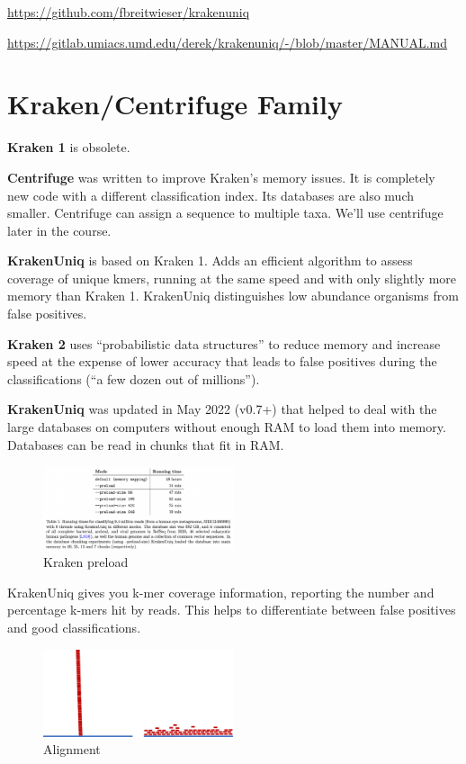 \documentclass[
]{book}
\begin{document}
\url{https://github.com/fbreitwieser/krakenuniq}

\url{https://gitlab.umiacs.umd.edu/derek/krakenuniq/-/blob/master/MANUAL.md}

\hypertarget{krakencentrifuge-family}{%
\section{Kraken/Centrifuge Family}\label{krakencentrifuge-family}}

\textbf{Kraken 1} is obsolete.

\textbf{Centrifuge} was written to improve Kraken's memory issues. It is completely new code with a different classification index. Its databases are also much smaller. Centrifuge can assign a sequence to multiple taxa. We'll use centrifuge later in the course.

\textbf{KrakenUniq} is based on Kraken 1. Adds an efficient algorithm to assess coverage of unique kmers, running at the same speed and with only slightly more memory than Kraken 1. KrakenUniq distinguishes low abundance organisms from false positives.

\textbf{Kraken 2} uses ``probabilistic data structures'' to reduce memory and increase speed at the expense of lower accuracy that leads to false positives during the classifications (``a few dozen out of millions'').

\textbf{KrakenUniq} was updated in May 2022 (v0.7+) that helped to deal with the large databases on computers without enough RAM to load them into memory. Databases can be read in chunks that fit in RAM.

\begin{figure}
\centering
\includegraphics[width=0.5\textwidth,height=\textheight]{./Figures/krakenFix.png}
\caption{Kraken preload}
\end{figure}

KrakenUniq gives you k-mer coverage information, reporting the number and percentage k-mers hit by reads. This helps to differentiate between false positives and good classifications.

\begin{figure}
\centering
\includegraphics[width=0.5\textwidth,height=\textheight]{./Figures/align.png}
\caption{Alignment}
\end{figure}
\end{document}

